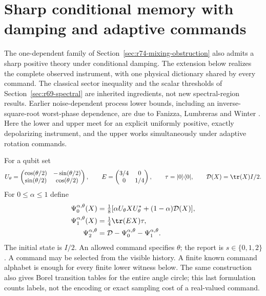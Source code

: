 \section{Sharp conditional memory with damping and adaptive commands}
\label{sec:r75-noisy-conditional}

The one-dependent family of Section~\ref{sec:r74-mixing-obstruction}
also admits a sharp positive theory under conditional damping.  The
extension below realizes the complete observed instrument, with one
physical dictionary shared by every command.  The classical sector
inequality and the scalar thresholds of Section~\ref{sec:r69-spectral}
are inherited ingredients, not new spectral-region results.  Earlier
noise-dependent process lower bounds, including an inverse-square-root
worst-phase dependence, are due to Fanizza, Lumbreras and Winter
\cite[Theorem 2 and Section 4.2]{Fanizza24}.  Here the lower and upper meet
for an explicit uniformly positive, exactly depolarizing instrument, and
the upper works simultaneously under adaptive rotation commands.

For a qubit set
\[
 U_\theta=\begin{pmatrix}
 \cos(\theta/2)&-\sin(\theta/2)\\
 \sin(\theta/2)&\cos(\theta/2)
 \end{pmatrix},\qquad
 E=\begin{pmatrix}3/4&0\\0&1/4\end{pmatrix},\qquad
 \tau=|0\rangle\langle0|,\qquad
 \mathcal D(X)=\tr(X)I/2.
\]
For $0\le\alpha\le1$ define
\begin{equation}\label{eq:r75-noisy-instrument}
 \begin{split}
 \Psi^{\alpha,\theta}_0(X)
   &=\tfrac18[\alpha U_\theta XU_\theta^*
                    +(1-\alpha)\mathcal D(X)],\\
 \Psi^{\alpha,\theta}_1(X)&=\tfrac14\tr(EX)\tau,\\
 \Psi^{\alpha,\theta}_2&=\mathcal D-\Psi^{\alpha,\theta}_0
                                      -\Psi^{\alpha,\theta}_1.
 \end{split}
\end{equation}
The initial state is $I/2$.  An allowed command specifies $\theta$; the
report is $s\in\{0,1,2\}$.  A command may be selected from the visible
history.  A finite known command alphabet is enough for every finite
lower witness below.  The same construction also gives Borel transition
tables for the entire angle circle; this last formulation counts labels,
not the encoding or exact sampling cost of a real-valued command.

